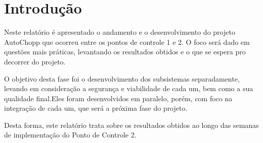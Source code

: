 \chapter[Introdução]{Introdução}

    Neste relatório é apresentado o andamento e o desenvolvimento do projeto AutoChopp que ocorreu entre os pontos de controle 1 e 2. O foco será dado em questões mais práticas, levantando os resultados obtidos e o que se espera pro decorrer do projeto.
    
    O objetivo desta fase foi o desenvolvimento dos subsistemas separadamente, levando em consideração a segurança e viabilidade de cada um, bem como a sua qualidade final.Eles foram desenvolvidos em  paralelo, porém, com foco na integração de cada um, que será a próxima fase do projeto.
    
    Desta forma, este relatório trata sobre os resultados obtidos ao longo das semanas de implementação do Ponto de Controle 2.

